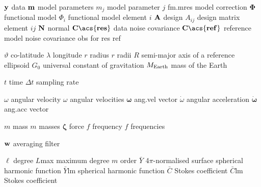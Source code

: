 \begin{acronym}[---------------]
				{${\bf y}$}							{data}
				{${\bf m}$}							{model parameters}
			{${m_j}$}								{model parameter $j$}
		{\acs{fm.m}\acs{res}}		{model correction}
 			{${\bm{\Phi}}$}					{functional model}
		{${\Phi_i}$}						{functional model element $i$}
				{${\bf A}$}							{design}
			{${A_{ij}}$}						{design matrix element $ij$}
				{${\bf N}$}							{normal}
				{${\bf C\acs{res}}$}		{data noise covariance}
			{${\bf C\acs{ref}}$}		{reference model noise covariance}
				{obs}
				{for}
				{res}
				{ref}

					{$\vartheta$}						{co-latitude}
				{$\lambda$}							{longitude}
					{$r$}										{radius}
															{$r$}										{radii}
	{$R$}										{semi-major axis of a reference ellipsoid}
						{$G_0$}									{universal constant of gravitation}
					{$M_{{\rm Earth}}$}			{mass of the Earth}

						{$t$}										{time}
			{$\Delta t$}						{sampling rate}

			{$\omega$}							{angular velocity}
															{$\omega$}							{angular velocities}
	{${\bm{\omega}}$}				{\acl{ang.vel} vector}
			{$\dot\omega$}					{angular acceleration}
	{${\bm{\dot\omega}}$}		{\acl{ang.acc} vector}

 				{$m$}										{mass}
															{$m$}										{masses}
				{${\bm{\zeta}}$}				{force}
				{$f$}										{frequency}
															{$f$}										{frequencies}

		{${\bf w}$}							{averaging filter}

			{$\ell$}								{degree}
	{$L$\acs{max}}					{maximum degree}
				{$m$}										{order}
		{$\bar Y$}							{4$\pi$-normalised surface spherical harmonic function}
	{$\bar Y$\acs{lm}}			{spherical harmonic function}
		{$\bar C$}							{Stokes coefficient}
	{$\bar C$\acs{lm}}			{Stokes coefficient}


\end{acronym}
